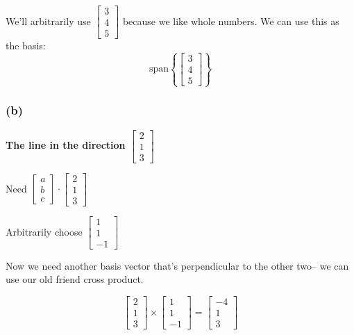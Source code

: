 \documentclass[10pt,letterpaper]{article}
\begin{document}
	We'll arbitrarily use $\begin{bmatrix}
		3 \\ 4 \\ 5
	\end{bmatrix}$ because we like whole numbers. We can use this as the basis: 
	$$
	\boxed{\text{span} \left\lbrace  \begin{bmatrix}
			3 \\ 4\\ 5
			\end{bmatrix} \right\rbrace } 
	$$
	
	\subsubsection*{(b)} \textbf{The line in the direction $\begin{bmatrix}
		2 \\ 1 \\ 3
		\end{bmatrix}$} 
		
		Need $\begin{bmatrix}
		a \\ b \\ c
		\end{bmatrix} \cdot \begin{bmatrix}
		2 \\ 1 \\ 3
		\end{bmatrix}$ 
		
		Arbitrarily choose $\begin{bmatrix}
		1 \\ 1\\ -1
		\end{bmatrix}$
		
		Now we need another basis vector that's perpendicular to the other two-- we can use our old friend cross product. 
		
		$$
		\begin{bmatrix}
		2 \\ 1\\ 3
		\end{bmatrix} \times \begin{bmatrix}
		1 \\ 1\\ -1
		\end{bmatrix} = \begin{bmatrix}
		-4 \\ 1\\ 3
		\end{bmatrix}
		$$ 
		
\end{document}
